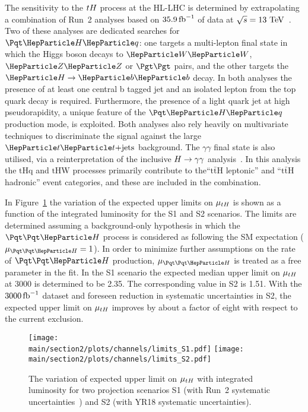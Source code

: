 
The sensitivity to the $tH$ process at the HL-LHC is determined by extrapolating a combination of Run~2 analyses based on $35.9\mbox{\ensuremath{\,\text{fb}^\text{$-$1}}}$ of data at $\sqrt{s}= 13 ~\text{TeV}$~\cite{Sirunyan:2018lzm}. Two of these analyses are dedicated searches for $\tHq$: one targets a multi-lepton final state in which the Higgs boson decays to $\ww$, $\zz$ or $\tautau$ pairs, and the other targets the $\hbb$ decay. In both analyses the presence of at least one central b tagged jet and an isolated lepton from the top quark decay is required. Furthermore, the presence of a light quark jet at high pseudorapidity, a unique feature of the $\tHq$ production mode, is exploited. Both analyses also rely heavily on multivariate techniques to discriminate the signal against the large $\ttjets$ background. The $\gamma\gamma$ final state is also utilised, via a reinterpretation of the inclusive $H\rightarrow\gamma\gamma$ analysis~\cite{Sirunyan:2018ouh}. In this analysis the $\mathrm{tHq}$ and $\mathrm{tHW}$ processes primarily contribute to the``$\mathrm{t\bar{t}H}$ leptonic'' and ``$\mathrm{t\bar{t}H}$ hadronic'' event categories, and these are included in the combination.


In Figure~\ref{fig:limit} the variation of the expected upper limits on $\mu_{tH}$ is shown as a function of the integrated luminosity for the S1 and S2 scenarios. The limits are determined assuming a background-only hypothesis in which the $\tth$ process is considered as following the SM expectation ($\mu_{\tth} = 1$). In order to minimize further assumptions on the rate of $\tth$ production, $\mu_{\tth}$ is treated as a free parameter in the fit.
In the S1 scenario the expected median upper limit on $\mu_{tH}$ at 3000 \fbinv is determined to be 2.35.
The corresponding value in S2 is 1.51. With the $3000 \mbox{\ensuremath{\,\text{fb}^\text{$-$1}}}$ dataset and foreseen reduction in systematic uncertainties in S2, the expected upper limit on $\mu_{tH}$ improves by about a factor of eight with respect to the current exclusion.

\begin{figure}[hbtp]
\begin{center}
\texttt{[image: \\main/section2/plots/channels/limits\_S1.pdf]} \hspace{1cm}
\texttt{[image: \\main/section2/plots/channels/limits\_S2.pdf]}
\end{center}
\caption{The variation of expected upper limit on $\mu_{tH}$ with integrated luminosity for two projection scenarios S1 (with Run~2 systematic uncertainties~\cite{CMS-PAS-HIG-18-009}) and S2 (with YR18 systematic uncertainties).}
\label{fig:limit}
\end{figure}

